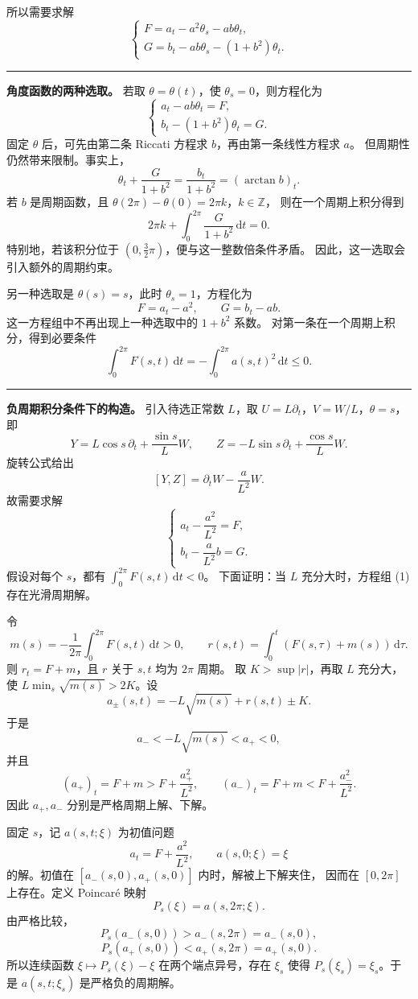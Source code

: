 \documentclass[11pt,a4paper]{ctexart}
\newcommand{\dd}{\,\mathrm d}
\newcommand{\sep}{\par\vspace{5pt}\noindent\rule{\linewidth}{0.7pt}\par\vspace{5pt}}
\newcommand{\red}[1]{{\color{red}#1}}
\begin{document}
所以需要求解
\[\begin{cases}F=a_t-a^2\theta_s-ab\theta_t,\\
G=b_t-ab\theta_s-(1+b^2)\theta_t.\end{cases}\]
\sep
\textbf{角度函数的两种选取。}
若取 $\theta=\theta(t)$，使 $\theta_s=0$，则方程化为
\[\begin{cases}a_t-ab\theta_t=F,\\
b_t-(1+b^2)\theta_t=G.\end{cases}\]
固定 $\theta$ 后，可先由第二条 Riccati 方程求 $b$，再由第一条线性方程求 $a$。
但周期性仍然带来限制。事实上，
\[\theta_t+\frac{G}{1+b^2}=\frac{b_t}{1+b^2}=(\arctan b)_t.\]
若 $b$ 是周期函数，且 $\theta(2\pi)-\theta(0)=2\pi k$，$k\in\mathbb Z$，
则在一个周期上积分得到
\[2\pi k+\int_0^{2\pi}\frac{G}{1+b^2}\dd t=0.\]
特别地，若该积分位于 $(0,\frac32\pi)$，便与这一整数倍条件矛盾。
因此，这一选取会引入额外的周期约束。

另一种选取是 $\theta(s)=s$，此时 $\theta_s=1$，方程化为
\[F=a_t-a^2,\qquad G=b_t-ab.\]
这一方程组中不再出现上一种选取中的 $1+b^2$ 系数。
对第一条在一个周期上积分，得到必要条件
\[\int_0^{2\pi}F(s,t)\dd t=-\int_0^{2\pi}a(s,t)^2\dd t\leq0.\]
\sep
\textbf{负周期积分条件下的构造。}
引入待选正常数 $L$，取 $U=L\partial_t$，$V=W/L$，$\theta=s$，即
\[Y=L\cos s\,\partial_t+\frac{\sin s}{L}W,\qquad
Z=-L\sin s\,\partial_t+\frac{\cos s}{L}W.\]
旋转公式给出
\[[Y,Z]=\partial_tW-\frac{a}{L^2}W.\]
故需要求解
\[\tag{1}\begin{cases}a_t-\dfrac{a^2}{L^2}=F,\\[3pt]
b_t-\dfrac{a}{L^2}b=G.\end{cases}\]
\red{假设对每个 $s$，都有 $\int_0^{2\pi}F(s,t)\dd t<0$。}
下面证明：当 $L$ 充分大时，方程组 (1) 存在光滑周期解。

令
\[m(s)=-\frac1{2\pi}\int_0^{2\pi}F(s,t)\dd t>0,\qquad
r(s,t)=\int_0^t(F(s,\tau)+m(s))\dd\tau.\]
则 $r_t=F+m$，且 $r$ 关于 $s,t$ 均为 $2\pi$ 周期。
取 $K>\sup|r|$，再取 $L$ 充分大，使 $L\min_s\sqrt{m(s)}>2K$。设
\[a_\pm(s,t)=-L\sqrt{m(s)}+r(s,t)\pm K.\]
于是
\[a_-<-L\sqrt{m(s)}<a_+<0,\]
并且
\[(a_+)_t=F+m>F+\frac{a_+^2}{L^2},\qquad
(a_-)_t=F+m<F+\frac{a_-^2}{L^2}.\]
因此 $a_+,a_-$ 分别是严格周期上解、下解。

固定 $s$，记 $a(s,t;\xi)$ 为初值问题
\[a_t=F+\frac{a^2}{L^2},\qquad a(s,0;\xi)=\xi\]
的解。初值在 $[a_-(s,0),a_+(s,0)]$ 内时，解被上下解夹住，
因而在 $[0,2\pi]$ 上存在。定义 Poincar\'e 映射
\[P_s(\xi)=a(s,2\pi;\xi).\]
由严格比较，
\[P_s(a_-(s,0))>a_-(s,2\pi)=a_-(s,0),\]
\[P_s(a_+(s,0))<a_+(s,2\pi)=a_+(s,0).\]
所以连续函数 $\xi\mapsto P_s(\xi)-\xi$ 在两个端点异号，存在
$\xi_s$ 使得 $P_s(\xi_s)=\xi_s$。于是 $a(s,t;\xi_s)$ 是严格负的周期解。
\end{document}
